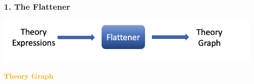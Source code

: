 \documentclass[t,10pt,numbers,fleqn,usenames,xcolor=dvipsnames]{beamer}
\begin{document}
\begin{frame}[fragile] 
\frametitle{1. The Flattener} 

\begin{center}
\includegraphics[scale=0.2]{figures/flattener.png}
\end{center}

\textcolor{Orange}{\textbf{Theory Graph}}


\end{frame}
\end{document}
